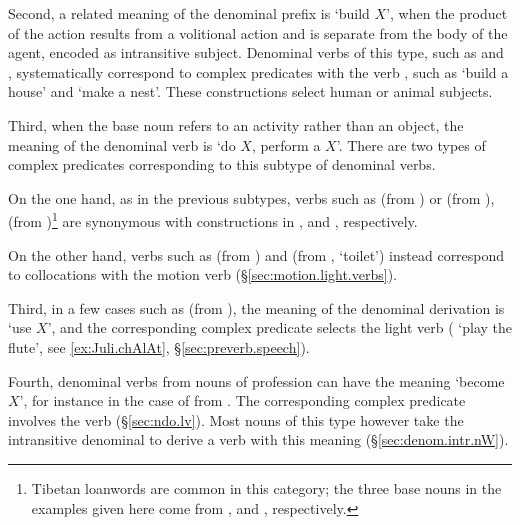 Second, a related meaning of  the  denominal prefix is `build $X$', when the product of the action results from a volitional action and is separate from the body of the agent, encoded as  
intransitive subject. Denominal verbs of this type, such as  and  ,  systematically correspond to complex predicates with the verb , such as  `build a house' and    `make a nest'. These constructions select human or animal subjects.

Third, when the base noun refers to an activity rather than an object, the meaning of the  denominal verb is `do $X$, perform a $X$'. There are two types of complex predicates corresponding to this subtype of denominal verbs. 

On the one hand, as in the previous subtypes, verbs such as   (from ) or  (from ),  (from )\footnote{Tibetan loanwords are common in this category; the three base nouns in the examples given here come from 
,  and , respectively.} are synonymous with constructions in ,  and , respectively. 

On the other hand, verbs such as   (from ) and  (from  , `toilet') instead correspond to collocations with the motion verb  (§\ref{sec:motion.light.verbs}). 
 
Third, in a few cases such as   (from ), the meaning of the denominal derivation is `use $X$', and the corresponding complex predicate selects the light verb  ( `play the flute', see \ref{ex:Juli.chAlAt}, §\ref{sec:preverb.speech}).
 
 Fourth,  denominal verbs from nouns of profession can have the meaning `become $X$', for instance in the case of  from  . The corresponding complex predicate involves the verb  (§\ref{sec:ndo.lv}). Most nouns of this type however take the intransitive denominal  to derive a verb with this meaning (§\ref{sec:denom.intr.nW}).
 
